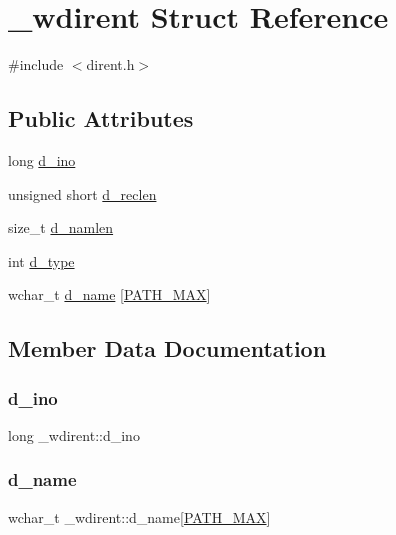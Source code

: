 \hypertarget{struct__wdirent}{}\section{\+\_\+wdirent Struct Reference}
\label{struct__wdirent}


{\ttfamily \#include $<$dirent.\+h$>$}

\subsection*{Public Attributes}
\begin{DoxyCompactItemize}
\item 
long \mbox{\hyperlink{struct__wdirent_ac8cfaf294a0b6a49287d3f384c280c93}{d\+\_\+ino}}
\item 
unsigned short \mbox{\hyperlink{struct__wdirent_aff7f360608e576cd18cf11f2caf13ef3}{d\+\_\+reclen}}
\item 
size\+\_\+t \mbox{\hyperlink{struct__wdirent_a0050d6131e6fa90206903e216b38799e}{d\+\_\+namlen}}
\item 
int \mbox{\hyperlink{struct__wdirent_a3c3874604ffccbeeaffd96709763cc3b}{d\+\_\+type}}
\item 
wchar\+\_\+t \mbox{\hyperlink{struct__wdirent_a267f915cd36cad5969337a9192cab567}{d\+\_\+name}} \mbox{[}\mbox{\hyperlink{dirent_8h_ae688d728e1acdfe5988c7db45d6f0166}{P\+A\+T\+H\+\_\+\+M\+AX}}\mbox{]}
\end{DoxyCompactItemize}


\subsection{Member Data Documentation}
\mbox{\label{struct__wdirent_ac8cfaf294a0b6a49287d3f384c280c93}} 
\subsubsection{\texorpdfstring{d\_ino}{d\_ino}}
{\footnotesize\ttfamily long \+\_\+wdirent\+::d\+\_\+ino}

\mbox{\label{struct__wdirent_a267f915cd36cad5969337a9192cab567}} 
\subsubsection{\texorpdfstring{d\_name}{d\_name}}
{\footnotesize\ttfamily wchar\+\_\+t \+\_\+wdirent\+::d\+\_\+name\mbox{[}\mbox{\hyperlink{dirent_8h_ae688d728e1acdfe5988c7db45d6f0166}{P\+A\+T\+H\+\_\+\+M\+AX}}\mbox{]}}

